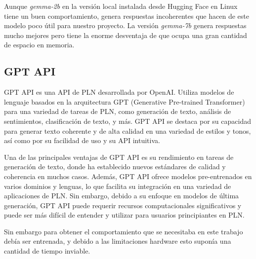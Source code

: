 Aunque \textit{gemma-2b} en la versión local instalada desde Hugging Face en Linux tiene un buen comportamiento, genera respuestas incoherentes que hacen de este modelo poco útil para nuestro proyecto. La versión \textit{gemma-7b} genera respuestas mucho mejores pero tiene la enorme desventaja de que ocupa una gran cantidad de espacio en memoria.

\subsection{GPT API}

GPT API es una API de PLN desarrollada por OpenAI. Utiliza modelos de lenguaje basados en la arquitectura GPT (Generative Pre-trained Transformer) para una variedad de tareas de PLN, como generación de texto, análisis de sentimientos, clasificación de texto, y más. GPT API se destaca por su capacidad para generar texto coherente y de alta calidad en una variedad de estilos y tonos, así como por su facilidad de uso y su API intuitiva.

Una de las principales ventajas de GPT API es su rendimiento en tareas de generación de texto, donde ha establecido nuevos estándares de calidad y coherencia en muchos casos. Además, GPT API ofrece modelos pre-entrenados en varios dominios y lenguas, lo que facilita su integración en una variedad de aplicaciones de PLN. Sin embargo, debido a su enfoque en modelos de última generación, GPT API puede requerir recursos computacionales significativos y puede ser más difícil de entender y utilizar para usuarios principiantes en PLN.

Sin embargo para obtener el comportamiento que se necesitaba en este trabajo debía ser entrenada, y debido a las limitaciones hardware esto suponía una cantidad de tiempo inviable. 

